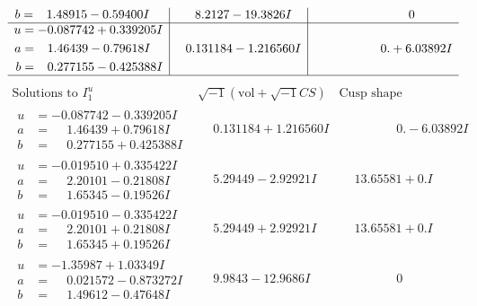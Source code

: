 \documentclass[1p]{elsarticle_modified}
\theoremstyle{definition}
\newcommand{\I}{\sqrt{-1}}
\begin{document}
$$\begin{array}{c|c|c}
\begin{aligned}
b &= \phantom{-}1.48915 - 0.59400 I\end{aligned}
 & \phantom{-}8.2127 - 19.3826 I & \phantom{-0.000000 } 0 \\ \hline\begin{aligned}
u &= -0.087742 + 0.339205 I \\
a &= \phantom{-}1.46439 - 0.79618 I \\
b &= \phantom{-}0.277155 - 0.425388 I\end{aligned}
 & \phantom{-}0.131184 - 1.216560 I & \phantom{-0.000000 -}0. + 6.03892 I\\
 \hline 
 \end{array}$$\newpage$$\begin{array}{c|c|c}  
\text{Solutions to }I^u_{1}& \I (\text{vol} + \sqrt{-1}CS) & \text{Cusp shape}\\
 \hline 
\begin{aligned}
u &= -0.087742 - 0.339205 I \\
a &= \phantom{-}1.46439 + 0.79618 I \\
b &= \phantom{-}0.277155 + 0.425388 I\end{aligned}
 & \phantom{-}0.131184 + 1.216560 I & \phantom{-0.000000 } 0. - 6.03892 I \\ \hline\begin{aligned}
u &= -0.019510 + 0.335422 I \\
a &= \phantom{-}2.20101 - 0.21808 I \\
b &= \phantom{-}1.65345 - 0.19526 I\end{aligned}
 & \phantom{-}5.29449 - 2.92921 I & \phantom{-}13.65581 + 0. I\phantom{ +0.000000I} \\ \hline\begin{aligned}
u &= -0.019510 - 0.335422 I \\
a &= \phantom{-}2.20101 + 0.21808 I \\
b &= \phantom{-}1.65345 + 0.19526 I\end{aligned}
 & \phantom{-}5.29449 + 2.92921 I & \phantom{-}13.65581 + 0. I\phantom{ +0.000000I} \\ \hline\begin{aligned}
u &= -1.35987 + 1.03349 I \\
a &= \phantom{-}0.021572 - 0.873272 I \\
b &= \phantom{-}1.49612 - 0.47648 I\end{aligned}
 & \phantom{-}9.9843 - 12.9686 I & \phantom{-0.000000 } 0 \\ \hline\begin{aligned}

\end{aligned}
\end{array}$$
\end{document}

